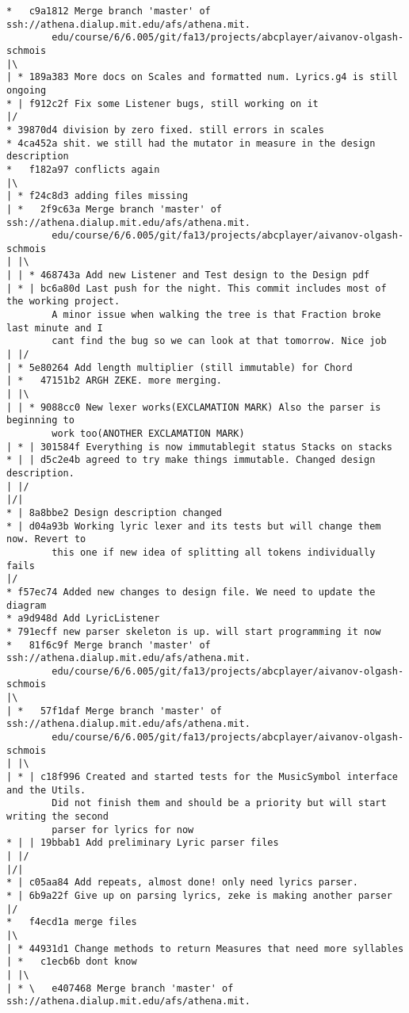 \documentclass[12pt]{book}
\begin{document}
\begin{Verbatim}
*   c9a1812 Merge branch 'master' of ssh://athena.dialup.mit.edu/afs/athena.mit.
        edu/course/6/6.005/git/fa13/projects/abcplayer/aivanov-olgash-schmois
|\
| * 189a383 More docs on Scales and formatted num. Lyrics.g4 is still ongoing
* | f912c2f Fix some Listener bugs, still working on it
|/
* 39870d4 division by zero fixed. still errors in scales
* 4ca452a shit. we still had the mutator in measure in the design description
*   f182a97 conflicts again
|\
| * f24c8d3 adding files missing
| *   2f9c63a Merge branch 'master' of ssh://athena.dialup.mit.edu/afs/athena.mit.
        edu/course/6/6.005/git/fa13/projects/abcplayer/aivanov-olgash-schmois
| |\
| | * 468743a Add new Listener and Test design to the Design pdf
| * | bc6a80d Last push for the night. This commit includes most of the working project. 
        A minor issue when walking the tree is that Fraction broke last minute and I 
        cant find the bug so we can look at that tomorrow. Nice job
| |/
| * 5e80264 Add length multiplier (still immutable) for Chord
| *   47151b2 ARGH ZEKE. more merging.
| |\
| | * 9088cc0 New lexer works(EXCLAMATION MARK) Also the parser is beginning to 
        work too(ANOTHER EXCLAMATION MARK)
| * | 301584f Everything is now immutablegit status Stacks on stacks
* | | d5c2e4b agreed to try make things immutable. Changed design description.
| |/
|/|
* | 8a8bbe2 Design description changed
* | d04a93b Working lyric lexer and its tests but will change them now. Revert to 
        this one if new idea of splitting all tokens individually fails
|/
* f57ec74 Added new changes to design file. We need to update the diagram
* a9d948d Add LyricListener
* 791ecff new parser skeleton is up. will start programming it now
*   81f6c9f Merge branch 'master' of ssh://athena.dialup.mit.edu/afs/athena.mit.
        edu/course/6/6.005/git/fa13/projects/abcplayer/aivanov-olgash-schmois
|\
| *   57f1daf Merge branch 'master' of ssh://athena.dialup.mit.edu/afs/athena.mit.
        edu/course/6/6.005/git/fa13/projects/abcplayer/aivanov-olgash-schmois
| |\
| * | c18f996 Created and started tests for the MusicSymbol interface and the Utils. 
        Did not finish them and should be a priority but will start writing the second 
        parser for lyrics for now
* | | 19bbab1 Add preliminary Lyric parser files
| |/
|/|
* | c05aa84 Add repeats, almost done! only need lyrics parser.
* | 6b9a22f Give up on parsing lyrics, zeke is making another parser
|/
*   f4ecd1a merge files
|\
| * 44931d1 Change methods to return Measures that need more syllables
| *   c1ecb6b dont know
| |\
| * \   e407468 Merge branch 'master' of ssh://athena.dialup.mit.edu/afs/athena.mit.

\end{Verbatim}
\end{document}

